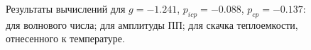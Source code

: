 
\begin{figure}[p]\label{fig:gpinit}
\centering
{}
\newline
{}
\newline
\caption{Результаты вычислений для $g= -1.241$, $p_{icp}= -0.088$, $p_{cp}=-0.137$:
\newline \protect{} для волнового числа; 
\newline \protect{} для амплитуды ПП;
\newline \protect{} для скачка теплоемкости, отнесенного к температуре.}
\end{figure}

